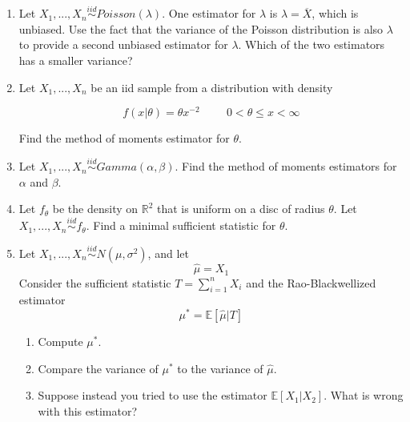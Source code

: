 \documentclass[11pt]{article}
\begin{document}
\begin{enumerate}

\item Let $X_1,...,X_n \overset{iid}{\sim} Poisson(\lambda)$. One estimator for $\lambda$ is $\widehat{\lambda} = \overline{X}$, which is unbiased. Use the fact that the variance of the Poisson distribution is also $\lambda$ to provide a second unbiased estimator for $\lambda$. Which of the two estimators has a smaller variance?

\bigskip

\item Let $X_1,...,X_n$ be an iid sample from a distribution with density

$$f(x|\theta) = \theta x^{-2} \hspace{1cm} 0 < \theta \leq x < \infty$$

Find the method of moments estimator for $\theta$.

\bigskip

\item Let $X_1,...,X_n \overset{iid}{\sim} Gamma(\alpha, \beta)$. Find the method of moments estimators for $\alpha$ and $\beta$.

\bigskip

\item Let $f_\theta$ be the density on $\mathbb{R}^2$ that is uniform on a disc of radius $\theta$. Let $X_1,...,X_n \overset{iid}{\sim} f_\theta$. Find a minimal sufficient statistic for $\theta$.

\bigskip

\item Let $X_1,...,X_n \overset{iid}{\sim} N(\mu, \sigma^2)$, and let 
$$\widehat{\mu} = X_1$$
Consider the sufficient statistic $T = \sum \limits_{i=1}^n X_i$ and the Rao-Blackwellized estimator
$$\mu^* = \mathbb{E}[\widehat{\mu} | T]$$

\begin{enumerate}
\item Compute $\mu^*$.

\item Compare the variance of $\mu^*$ to the variance of $\widehat{\mu}$.

\item Suppose instead you tried to use the estimator $\mathbb{E}[X_1 | X_2]$. What is wrong with this estimator?
\end{enumerate}

\end{enumerate}
\end{document}
